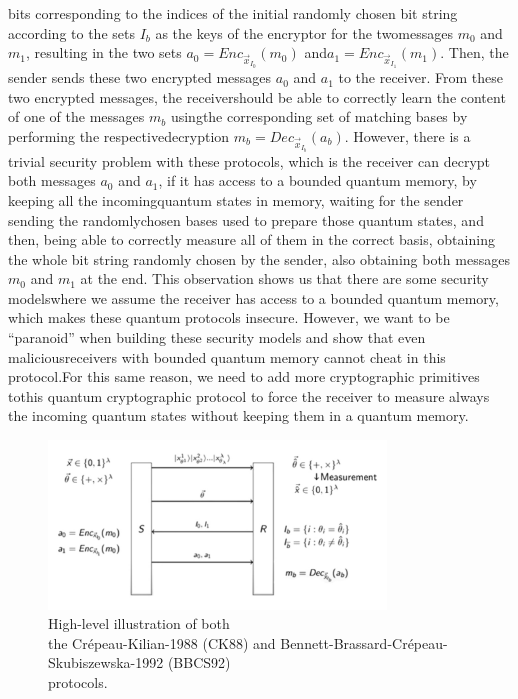 \documentclass[12pt]{article}
\begin{document}
bits corresponding to the indices of the initial randomly chosen bit string according to the sets ${I}_{b}$ as the keys of the encryptor for the two\break messages ${m}_{0}$ and ${m}_{1}$, resulting in the two sets ${a}_{0} = {Enc}_{{\vec{x}}_{{I}_{0}}}({m}_{0})$ and\break ${a}_{1} = {Enc}_{{\vec{x}}_{{I}_{1}}}({m}_{1})$. Then, the sender sends these two encrypted messages ${a}_{0}$ and ${a}_{1}$ to the receiver. From these two encrypted messages, the receiver\break should be able to correctly learn the content of one of the messages ${m}_{b}$ using\break the corresponding set of matching bases by performing the respective\break decryption ${m}_{b} = {Dec}_{{\vec{x}}_{{I}_{b}}}({a}_{b})$. However, there is a trivial security problem with these protocols, which is the receiver can decrypt both messages ${a}_{0}$ and ${a}_{1}$, if it has access to a bounded quantum memory, by keeping all the incoming\break quantum states in memory, waiting for the sender sending the randomly\break chosen bases used to prepare those quantum states, and then, being able to correctly measure all of them in the correct basis, obtaining the whole bit string randomly chosen by the sender, also obtaining both messages ${m}_{0}$ and ${m}_{1}$ at the end. This observation shows us that there are some security models\break where we assume the receiver has access to a bounded quantum memory, which makes these quantum protocols insecure. However, we want to be ``paranoid'' when building these security models and show that even malicious\break receivers with bounded quantum memory cannot cheat in this protocol.\break For this same reason, we need to add more cryptographic primitives to\break this quantum cryptographic protocol to force the receiver to measure always the incoming quantum states without keeping them in a quantum memory.

   \begin{figure}[ht]
        \captionsetup{justification=centering}
        \centering
        \includegraphics[width=0.8\textwidth]{figures/images/img-7.pdf}
        \caption{High-level illustration of both\\ the Cr\'{e}peau-Kilian-1988 (CK88) and Bennett-Brassard-Cr\'{e}peau-Skubiszewska-1992 (BBCS92)\\ protocols.}
        \label{fig:crepeau-kilian-1988-and-bennett-brassard-crepeau-skubiszewska-1992-protocols}
    \end{figure}
        
\end{document}
